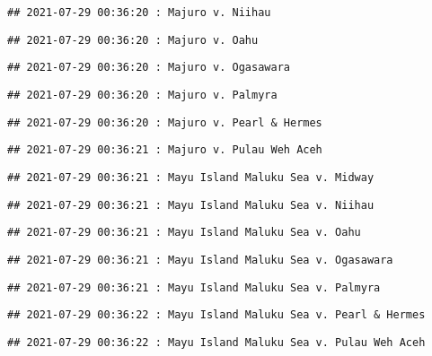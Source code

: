 \documentclass[
]{article}
\begin{document}
\begin{verbatim}
## 2021-07-29 00:36:20 : Majuro v. Niihau
\end{verbatim}

\begin{verbatim}
## 2021-07-29 00:36:20 : Majuro v. Oahu
\end{verbatim}

\begin{verbatim}
## 2021-07-29 00:36:20 : Majuro v. Ogasawara
\end{verbatim}

\begin{verbatim}
## 2021-07-29 00:36:20 : Majuro v. Palmyra
\end{verbatim}

\begin{verbatim}
## 2021-07-29 00:36:20 : Majuro v. Pearl & Hermes
\end{verbatim}

\begin{verbatim}
## 2021-07-29 00:36:21 : Majuro v. Pulau Weh Aceh
\end{verbatim}

\begin{verbatim}
## 2021-07-29 00:36:21 : Mayu Island Maluku Sea v. Midway
\end{verbatim}

\begin{verbatim}
## 2021-07-29 00:36:21 : Mayu Island Maluku Sea v. Niihau
\end{verbatim}

\begin{verbatim}
## 2021-07-29 00:36:21 : Mayu Island Maluku Sea v. Oahu
\end{verbatim}

\begin{verbatim}
## 2021-07-29 00:36:21 : Mayu Island Maluku Sea v. Ogasawara
\end{verbatim}

\begin{verbatim}
## 2021-07-29 00:36:21 : Mayu Island Maluku Sea v. Palmyra
\end{verbatim}

\begin{verbatim}
## 2021-07-29 00:36:22 : Mayu Island Maluku Sea v. Pearl & Hermes
\end{verbatim}

\begin{verbatim}
## 2021-07-29 00:36:22 : Mayu Island Maluku Sea v. Pulau Weh Aceh
\end{verbatim}
\end{document}
